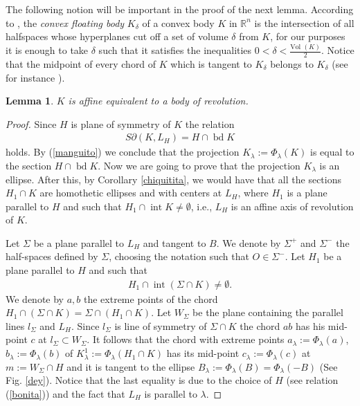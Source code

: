 \documentclass[12pt]{amsart}
\newcommand{\inte}{\operatorname*{int}}
\newcommand{\bd}{\operatorname*{bd}}
\newcommand{\Rn}{\mathbb{R}^{n}}
\newtheorem{lemma}{Lemma}
\begin{document}
                 The following notion will be important in the proof of the next lemma. According to 
                 \cite{werner}, the \textit{convex floating body} $K_{\delta}$ of a convex body $K$ in 
                 $\Rn$ is the intersection of all halfspaces whose hyperplanes cut off a set of volume 
                 $\delta$ from $K$, for our purposes it is enough to take $\delta$ such that it satisfies 
                 the inequalities $0<\delta < \frac{\textrm{Vol } (K)}{2}$. Notice that the midpoint of 
                 every chord of $K$ which is tangent to $K_{\delta}$ belongs to $K_{\delta}$ (see for 
                 instance \cite{schutt}). 
\begin{lemma}\label{tamarindo}
        $K$ is affine equivalent to a body of revolution.    
\end{lemma}
 \begin{proof}
                   Since $H$ is plane of symmetry of $K$ the relation
\begin{eqnarray}\label{manguito}
         S\partial(K,L_H)=H\cap \bd K    
\end{eqnarray}
                  holds. By (\ref{manguito}) we conclude that  the projection 
                 $K_{\lambda}:=\Phi_{\lambda}(K)$ 
                  is equal to the section $H\cap \bd K$. Now we are going to prove that the projection 
                  $K_{\lambda}$ is an ellipse. After this, by Corollary \ref{chiquitita}, we would have that all the sections   
                  $H_1\cap K$ are homothetic ellipses and with centers at $L_H$, where $H_1$ is a plane parallel to $H$ and such 
                  that $H_1\cap \inte K\not= \emptyset$, i.e., $L_H$ is an affine axis of revolution of $K$.
                  
                   Let $\Sigma$ be a plane parallel to $L_H$ and tangent to $B$. We denote by 
                  $\Sigma^{+}$ and $\Sigma^{-}$ the half-spaces defined by $\Sigma$, choosing the 
                  notation such that $O\in \Sigma^{-}$. Let $H_1$ be a plane parallel to $H$ and such 
                  that 
\begin{eqnarray}\label{ale}
                  H_1\cap \inte (\Sigma \cap K)\not= \emptyset.
\end{eqnarray}
                  We denote by $a,b$ the extreme points of the chord $ H_1 \cap (\Sigma  \cap K)=\Sigma  \cap (H_1\cap K)$. 
                  Let $W_{\Sigma}$ be the plane containing the parallel lines $l_{\Sigma}$ and 
                  $L_H$. Since $l_{\Sigma}$ is line of symmetry of $ \Sigma \cap K$ the chord 
                  $ab$ has his mid-point $c$ at $l_{\Sigma}\subset W_{\Sigma}$. It follows that the 
                  chord with extreme points $a_{\lambda}:=\Phi_{ \lambda}(a)$,
                  $b_{\lambda}:=\Phi_{\lambda}(b)$ of $K_{\lambda}^{1}:=\Phi_{\lambda}(H_1 \cap K)$ 
                  has its mid-point $c_{\lambda}:=\Phi_{\lambda}(c)$ at $m:=W_{\Sigma}\cap H$ and 
                  it is tangent to the ellipse $B_{\lambda}:=\Phi_{\lambda}(B)=\Phi_{\lambda}(-B)$ (See Fig. \ref{dey}). 
                  Notice that the last equality is due to the choice of $H$ (see relation (\ref{bonita})) and the fact that 
                  $L_H$ is parallel to $\lambda$. 


\end{proof}
\end{document}
